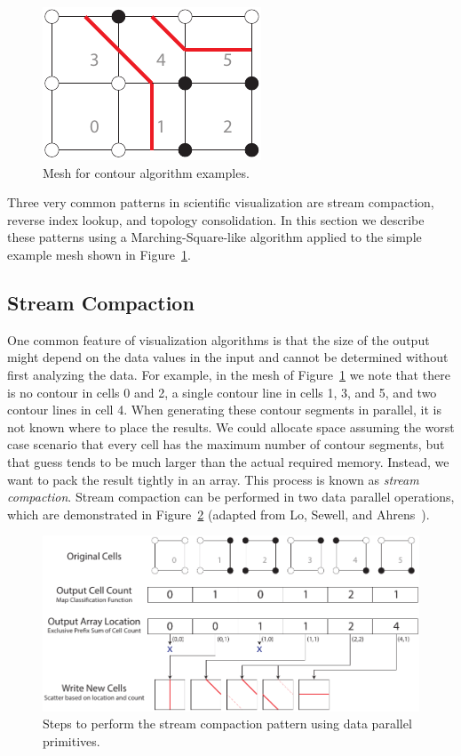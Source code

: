 \documentclass{superfri}
\newcommand*{\scite}[1]{~\cite{#1}}
\newcommand*{\keyterm}[1]{\emph{#1}}
\begin{document}
\begin{figure}
  \vspace{-\baselineskip}
  \includegraphics{images/ExampleMesh}
  \caption{Mesh for contour algorithm examples.}
  \label{fig:ExampleMesh}
  \vspace{-2\baselineskip}
\end{figure}

Three very common patterns in scientific visualization are stream
compaction, reverse index lookup, and topology consolidation. In this
section we describe these patterns using a Marching-Square-like algorithm
applied to the simple example mesh shown in Figure~\ref{fig:ExampleMesh}.

\subsection{Stream Compaction}

\noindent
One common feature of visualization algorithms is that the size of the
output might depend on the data values in the input and cannot be
determined without first analyzing the data. For example, in the mesh of
Figure~\ref{fig:ExampleMesh} we note that there is no contour in cells 0
and 2, a single contour line in cells 1, 3, and 5, and two contour lines in
cell 4. When generating these contour segments in parallel, it is not known
where to place the results. We could allocate space assuming the worst case
scenario that every cell has the maximum number of contour segments, but
that guess tends to be much larger than the actual required memory.
Instead, we want to pack the result tightly in an array. This process is
known as \keyterm{stream compaction}. Stream compaction can be performed in
two data parallel operations, which are demonstrated in
Figure~\ref{fig:StreamCompaction} (adapted from Lo, Sewell, and
Ahrens\scite{PISTON}).

\begin{figure}[htb]
  \centering
  \includegraphics[scale=.9]{images/StreamCompaction}
  \caption{Steps to perform the stream compaction pattern using data
    parallel primitives.}
  \label{fig:StreamCompaction}
\end{figure}
\end{document}
